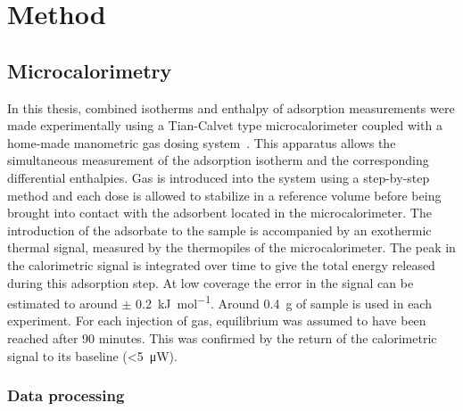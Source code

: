 
\section{Method}

\subsection{Microcalorimetry}

In this thesis, combined isotherms and enthalpy of adsorption
measurements were made experimentally using a Tian-Calvet type
microcalorimeter coupled with a home-made manometric gas dosing
system~\cite{llewellynGasAdsorptionMicrocalorimetry2005}. 
This apparatus allows the simultaneous measurement 
of the adsorption isotherm and the corresponding differential 
enthalpies. Gas is introduced into the system using a step-by-step
method and each dose is allowed to stabilize in a
reference volume before being brought into contact with the
adsorbent located in the microcalorimeter. The introduction of the
adsorbate to the sample is accompanied by an exothermic thermal signal,
measured by the thermopiles of the microcalorimeter. The peak in the
calorimetric signal is integrated over time 
to give the total energy released during this adsorption step.
At low coverage the error in the signal can be estimated to around 
\( \pm \) \SI{0.2} {\kilo\joule\per\mol}. Around \SI{0.4}{\gram} of 
sample is used in each experiment. 
For each injection of gas, equilibrium was assumed to have
been reached after 90 minutes. This was confirmed by the return
of the calorimetric signal to its baseline (<\SI{5}{\micro\watt}).


\subsubsection{Data processing}